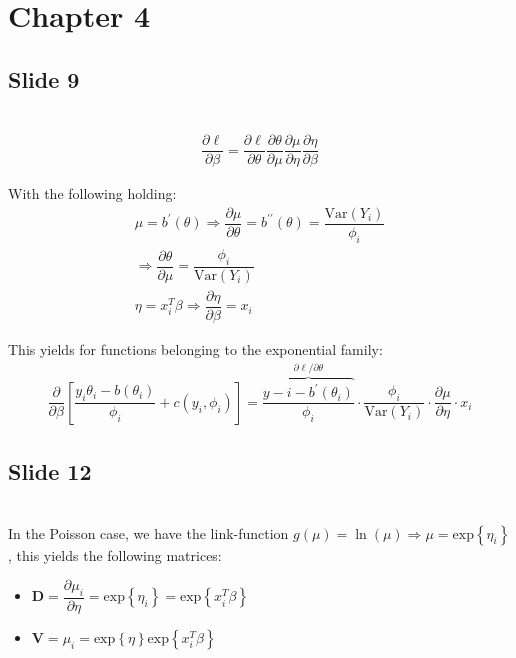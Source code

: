 \section{Chapter 4}
\subsection{Slide 9}\hfill\\

\begin{equation*}
  \begin{gathered}
    \dfrac{\partial \ell}{\partial \beta} = \dfrac{\partial \ell}{\partial \theta}\dfrac{\partial \theta}{\partial \mu}\dfrac{\partial \mu}{\partial \eta}\dfrac{\partial \eta}{\partial \beta}
  \end{gathered}
\end{equation*}
\par\bigskip
\noindent With the following holding:
\begin{equation*}
  \begin{gathered}
    \mu = b^{\prime}(\theta)\Rightarrow \dfrac{\partial \mu}{\partial \theta}= b^{\prime\prime}(\theta) = \dfrac{\text{Var}\left(Y_i\right)}{\phi_i}\\
    \Rightarrow \dfrac{\partial \theta}{\partial \mu} = \dfrac{\phi_i}{\text{Var}\left(Y_i\right)}\\
    \eta = x_i^T\beta\Rightarrow \dfrac{\partial \eta}{\partial \beta} = x_i
  \end{gathered}
\end{equation*}\par
\noindent This yields for functions belonging to the exponential family: 
\begin{equation*}
  \begin{gathered}
    \dfrac{\partial }{\partial \beta}\left[\dfrac{y_i\theta_i-b(\theta_i)}{\phi_i}+c(y_i,\phi_i)\right] = \overbrace{\dfrac{y-i-b^{\prime}(\theta_i)}{\phi_i}}^{\partial \ell/\partial \theta}\cdot\dfrac{\phi_i}{\text{Var}\left(Y_i\right)}\cdot\dfrac{\partial \mu}{\partial \eta}\cdot x_i
  \end{gathered}
\end{equation*}
\par\bigskip
\subsection{Slide 12}\hfill\\
\noindent In the Poisson case, we have the link-function $g(\mu) = \ln{\left(\mu\right)}\Rightarrow\mu = \text{exp}\left\{\eta_i\right\}$, this yields the following matrices:\par
\begin{itemize}
  \item $\boldsymbol{D} = \dfrac{\partial \mu_i}{\partial \eta} = \text{exp}\left\{\eta_i\right\} = \text{exp}\left\{x_i^T\beta\right\}$
  \item $\boldsymbol{V} = \mu_i=\text{exp}\left\{\eta\right\}  \text{exp}\left\{x_i^T\beta\right\}$
\end{itemize}
\par\bigskip
